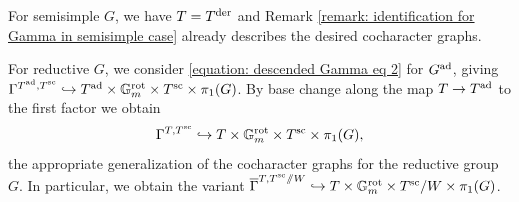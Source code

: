  

\begin{remark}\label{remark: identification for Gamma in general reductive case}
For semisimple $G$, we have $T=T^{\mathrm{der}}$ and Remark \ref{remark: identification for Gamma in semisimple case} already describes the desired cocharacter graphs.

For reductive $G$, we consider \eqref{equation: descended Gamma eq 2} for $G^{\operatorname{ad}}$, giving $\Gamma^{T^{\operatorname{ad}}, T^{\mathrm{sc}}} \hookrightarrow T^{\operatorname{ad}} \times \mathbb{G}_m^{\mathrm{rot}} \times T^{\mathrm{sc}} \times \pi_1(G)$. By base change along the map $T \to T^{\operatorname{ad}}$ to the first factor we obtain
\begin{equation}\label{equation: descended Gamma eq 3}
    \Gamma^{T, T^{\mathrm{sc}}} \hookrightarrow T \times \mathbb{G}_m^{\mathrm{rot}} \times T^{\mathrm{sc}} \times \pi_1(G),
\end{equation}
the appropriate generalization of the cocharacter graphs for the reductive group $G$.
In particular, we obtain the variant $\overline{\Gamma}^{T, T^{\mathrm{sc}}\sslash W} \hookrightarrow T \times \mathbb{G}_m^{\mathrm{rot}} \times T^{\mathrm{sc}}\slash W \times \pi_1(G)$. 
\end{remark}

